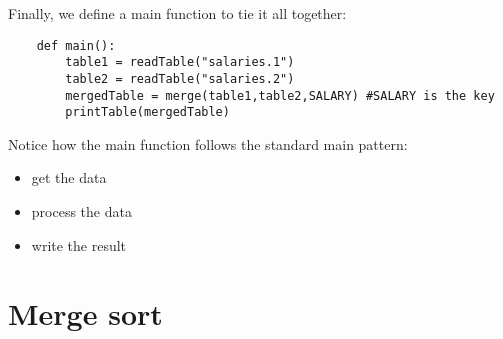 Finally, we define a main function to tie it all together:

\begin{verbatim}
    def main():
        table1 = readTable("salaries.1")
        table2 = readTable("salaries.2")
        mergedTable = merge(table1,table2,SALARY) #SALARY is the key
        printTable(mergedTable)
\end{verbatim}

Notice how the main function follows the standard main
pattern:

\begin{itemize}
\item
        get the data
\item
        process the data
\item
        write the result
\end{itemize}

\section{Merge sort}
